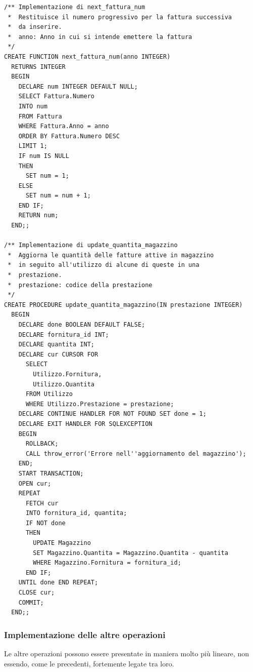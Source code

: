         \begin{lstlisting}
/** Implementazione di next_fattura_num
 *  Restituisce il numero progressivo per la fattura successiva
 *  da inserire.
 *  anno: Anno in cui si intende emettere la fattura
 */
CREATE FUNCTION next_fattura_num(anno INTEGER)
  RETURNS INTEGER
  BEGIN
    DECLARE num INTEGER DEFAULT NULL;
    SELECT Fattura.Numero
    INTO num
    FROM Fattura
    WHERE Fattura.Anno = anno
    ORDER BY Fattura.Numero DESC
    LIMIT 1;
    IF num IS NULL
    THEN
      SET num = 1;
    ELSE
      SET num = num + 1;
    END IF;
    RETURN num;
  END;;

/** Implementazione di update_quantita_magazzino
 *  Aggiorna le quantità delle fatture attive in magazzino
 *  in seguito all'utilizzo di alcune di queste in una 
 *  prestazione.
 *  prestazione: codice della prestazione
 */
CREATE PROCEDURE update_quantita_magazzino(IN prestazione INTEGER)
  BEGIN
    DECLARE done BOOLEAN DEFAULT FALSE;
    DECLARE fornitura_id INT;
    DECLARE quantita INT;
    DECLARE cur CURSOR FOR
      SELECT
        Utilizzo.Fornitura,
        Utilizzo.Quantita
      FROM Utilizzo
      WHERE Utilizzo.Prestazione = prestazione;
    DECLARE CONTINUE HANDLER FOR NOT FOUND SET done = 1;
    DECLARE EXIT HANDLER FOR SQLEXCEPTION
    BEGIN
      ROLLBACK;
      CALL throw_error('Errore nell''aggiornamento del magazzino');
    END;
    START TRANSACTION;
    OPEN cur;
    REPEAT
      FETCH cur
      INTO fornitura_id, quantita;
      IF NOT done
      THEN
        UPDATE Magazzino
        SET Magazzino.Quantita = Magazzino.Quantita - quantita
        WHERE Magazzino.Fornitura = fornitura_id;
      END IF;
    UNTIL done END REPEAT;
    CLOSE cur;
    COMMIT;
  END;;
        \end{lstlisting}

        \subsubsection{Implementazione delle altre operazioni}
          Le altre operazioni possono essere presentate in maniera molto più lineare, non essendo, come le precedenti, fortemente legate tra loro.

